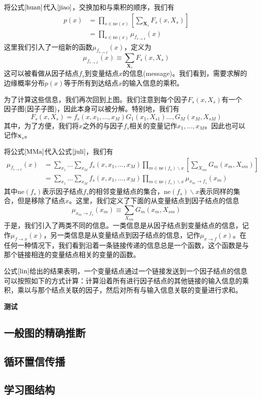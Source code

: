 将公式$\ref{huan}$代入$\ref{jiao}$，交换加和与乘积的顺序，我们有
\begin{equation}
	\begin{aligned}
		p(x)&=\prod_{s\in \mathrm{ne}(x)}\left[\sum_{\boldsymbol{X}_s}F_s(x,X_s) \right]\\
		&=\prod_{s\in \mathrm{ne}(x)}\mu_{f_{s\to x}}(x)
	\end{aligned}
\end{equation}
这里我们引入了一组新的函数$\mu_{f_{s\to x}}(x)$，定义为
\begin{equation}
\label{juli}
	\mu_{f_{s\to x}}(x)\equiv \sum_{\boldsymbol{X}_s}F_s(x,X_s)
\end{equation}
这可以被看做从因子结点$f_s$到变量结点$x$的信息(message)。我们看到，需要求解的边缘概率分布$p(x)$等于所有到达结点$x$的输入信息的乘积。

为了计算这些信息，我们再次回到上图。我们注意到每个因子$F_s(x,X_s)$有一个因子图(因子子图)，因此本身可以被分解。特别地，我们有
\begin{equation}
\label{MMa}
	F_s(x,X_s)=f_s(x,x_1,\dots,x_M)G_1(x_1,X_{s1})\dots,G_M(x_M,X_{sM})
\end{equation}
其中，为了方便，我们将$x$之外的与因子$f_s$相关的变量记作$x_1,\dots,x_M$。因此也可以记作$\boldsymbol{x}_s$。

将公式$\ref{MMa}$代入公式$\ref{juli}$，我们有
\begin{equation}
\label{lin}
	\begin{aligned}
	\mu_{f_{s\to x}}(x)&=\sum_{x_1}\dots\sum_{x_M}f_s(x,x_1,\dots,x_M)\prod_{m\in \mathrm{ne}(f_s)\backslash x}\left[\sum_{X_{sm}}G_m(x_m,X_{sm}) \right]\\
	&=\sum_{x_1}\dots\sum_{x_M}f_s(x,x_1,\dots,x_M)\prod_{m\in \mathrm{ne}(f_s)\backslash x}\mu_{x_{m}\to f_s}(x_m)
	\end{aligned}
\end{equation}
其中$\mathrm{ne}(f_s)$表示因子结点$f_s$的相邻变量结点的集合，$\mathrm{ne}(f_s)\backslash x$表示同样的集合，但是移除了结点$x$。这里，我们定义了下面的从变量结点到因子结点的信息
\begin{equation}
	\mu_{x_{m}\to f_s}(x_m)\equiv \sum_{X_{sm}}G_m(x_m,X_{sm})
\end{equation}
于是，我们引入了两类不同的信息。一类信息是从因子结点到变量结点的信息，记作$\mu_{f\to x}(x)$，另一类信息是从变量结点到因子结点的信息，记作$\mu_{x\to f}(x)$。在任何一种情况下，我们看到沿着一条链接传递的信息总是一个函数，这个函数是与那个链接相连的变量结点相关的变量的函数。

公式$\ref{lin}$给出的结果表明，一个变量结点通过一个链接发送到一个因子结点的信息可以按照如下的方式计算：计算沿着所有进行因子结点的其他链接的输入信息的乘积，乘以与那个结点关联的因子，然后对所有与输入信息关联的变量进行求和。

\textbf{测试}
\subsection*{一般图的精确推断}
\subsection*{循环置信传播}
\subsection*{学习图结构}